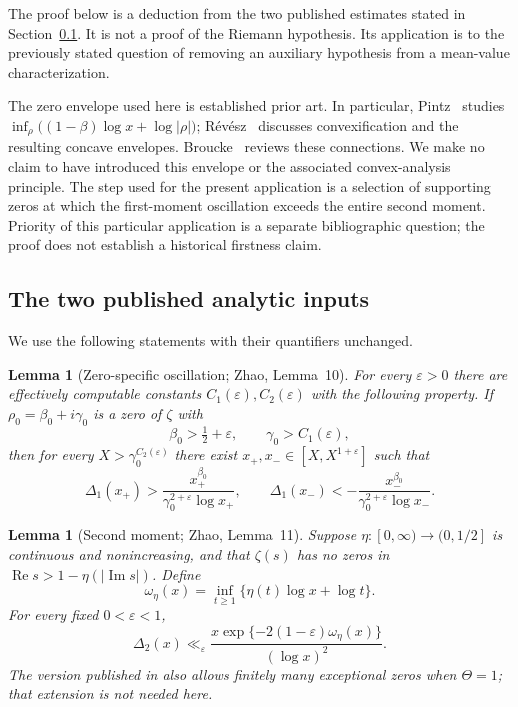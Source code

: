 \documentclass[11pt,a4paper]{article}
\numberwithin{equation}{section}
\newtheorem{lemma}[theorem]{Lemma}
\theoremstyle{definition}\newtheorem{definition}[theorem]{Definition}
\theoremstyle{remark}\newtheorem{remark}[theorem]{Remark}
\begin{document}
The proof below is a deduction from the two published estimates stated
in Section~\ref{sec:zhao-inputs}. It is not a proof of the Riemann
hypothesis. Its application is to the previously stated question of
removing an auxiliary hypothesis from a mean-value characterization.

The zero envelope used here is established prior art. In particular,
Pintz~\cite{Pintz2017} studies
$\inf_\rho\bigl((1-\beta)\log x+\log|\rho|\bigr)$;
R\'ev\'esz~\cite{Revesz2025} discusses convexification and the resulting
concave envelopes. Broucke~\cite[Introduction and Section~2]{Broucke2026}
reviews these connections. We make no claim to have introduced this
envelope or the associated convex-analysis principle. The step used
for the present application is a selection of supporting zeros at
which the first-moment oscillation exceeds the entire second moment.
Priority of this particular application is a separate bibliographic
question; the proof does not establish a historical firstness claim.

\subsection{The two published analytic inputs}
\label{sec:zhao-inputs}

We use the following statements with their quantifiers unchanged.

\begin{lemma}[Zero-specific oscillation; Zhao, Lemma~10]
\label{lem:zhao-published-oscillation}
For every $\varepsilon>0$ there are effectively computable constants
$C_1(\varepsilon),C_2(\varepsilon)$ with the following property.
If $\rho_0=\beta_0+i\gamma_0$ is a zero of $\zeta$ with
\[
 \beta_0>\tfrac12+\varepsilon,
 \qquad \gamma_0>C_1(\varepsilon),
\]
then for every $X>\gamma_0^{C_2(\varepsilon)}$ there exist
$x_+,x_-\in[X,X^{1+\varepsilon}]$ such that
\begin{equation}
 \label{eq:zhao-published-omega}
 \Delta_1(x_+)>
     \frac{x_+^{\beta_0}}{\gamma_0^{2+\varepsilon}\log x_+},
 \qquad
 \Delta_1(x_-)<-
     \frac{x_-^{\beta_0}}{\gamma_0^{2+\varepsilon}\log x_-}.
\end{equation}
\end{lemma}

\begin{lemma}[Second moment; Zhao, Lemma~11]
\label{lem:zhao-published-moment}
Suppose $\eta:[0,\infty)\to(0,1/2]$ is continuous and
nonincreasing, and that $\zeta(s)$ has no zeros in
$\operatorname{Re}s>1-\eta(|\operatorname{Im}s|)$.
Define
\[
 \omega_\eta(x)=\inf_{t\geq1}
                  \{\eta(t)\log x+\log t\}.
\]
For every fixed $0<\varepsilon<1$,
\begin{equation}
 \label{eq:zhao-published-second}
 \Delta_2(x)\ll_\varepsilon
   \frac{x\exp\{-2(1-\varepsilon)\omega_\eta(x)\}}
        {(\log x)^2}.
\end{equation}
The version published in \cite{Zhao2025} also allows finitely many
exceptional zeros when $\Theta=1$; that extension is not needed here.
\end{lemma}
\end{document}

